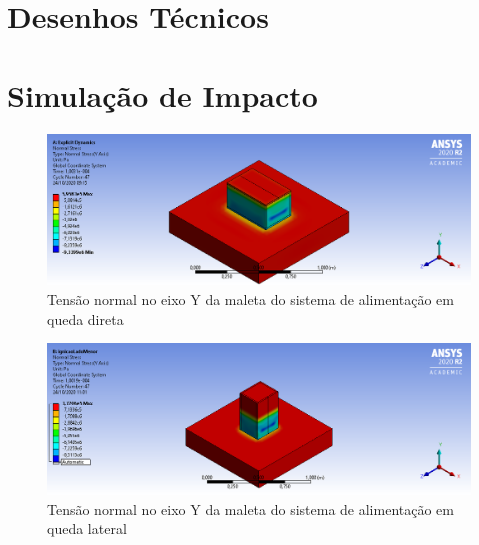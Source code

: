 \begin{apendicesenv}
\chapter{Desenhos Técnicos}
\label{Drafts_do_projeto}



\label{GCS}



\label{GCS1}



\label{MAbastecimento}



\label{MAbastecimento1}

\chapter{Simulação de Impacto}
\label{simulacoes_impacto}

\begin{figure}[htb]
    \centering
    \includegraphics[width=1.0\textwidth, angle=0]{figuras/estrutura_simulacaoImpacto/ignicaoNormalYLadoMaior.png}
    \caption{Tensão normal no eixo Y da maleta do sistema de alimentação em queda direta}
    \label{fig:simulacaoImpacto_01}
\end{figure}

\begin{figure}[htb]
    \centering
    \includegraphics[width=1.0\textwidth, angle=0]{figuras/estrutura_simulacaoImpacto/ignicaoNormalYLadoMenor.png}
    \caption{Tensão normal no eixo Y da maleta do sistema de alimentação em queda lateral}
    \label{fig:simulacaoImpacto_02}
\end{figure}


\end{apendicesenv}
